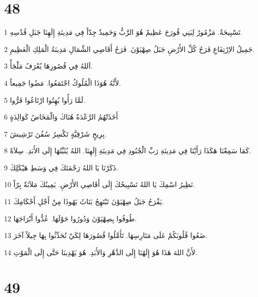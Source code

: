 \chapter{48}

\par 1 تَسْبِيحَةٌ. مَزْمُورٌ لِبَنِي قُورَحَ عَظِيمٌ هُوَ الرَّبُّ وَحَمِيدٌ جِدّاً فِي مَدِينَةِ إِلَهِنَا جَبَلِ قُدْسِهِ.
\par 2 جَمِيلُ الاِرْتِفَاعِ فَرَحُ كُلِّ الأَرْضِ جَبَلُ صِهْيَوْنَ. فَرَحُ أَقَاصِي الشِّمَالِ مَدِينَةُ الْمَلِكِ الْعَظِيمِ.
\par 3 اَللهُ فِي قُصُورِهَا يُعْرَفُ مَلْجَأً.
\par 4 لأَنَّهُ هُوَذَا الْمُلُوكُ اجْتَمَعُوا. مَضُوا جَمِيعاً.
\par 5 لَمَّا رَأُوا بُهِتُوا ارْتَاعُوا فَرُّوا.
\par 6 أَخَذَتْهُمُ الرَّعْدَةُ هُنَاكَ وَالْمَخَاضُ كَوَالِدَةٍ
\par 7 بِرِيحٍ شَرْقِيَّةٍ تَكْسِرُ سُفُنَ تَرْشِيشَ.
\par 8 كَمَا سَمِعْنَا هَكَذَا رَأَيْنَا فِي مَدِينَةِ رَبِّ الْجُنُودِ فِي مَدِينَةِ إِلَهِنَا. اللهُ يُثَبِّتُهَا إِلَى الأَبَدِ. سِلاَهْ.
\par 9 ذَكَرْنَا يَا اللهُ رَحْمَتَكَ فِي وَسَطِ هَيْكَلِكَ.
\par 10 نَظِيرُ اسْمِكَ يَا اللهُ تَسْبِيحُكَ إِلَى أَقَاصِي الأَرْضِ. يَمِينُكَ مَلآنَةٌ بِرّاً.
\par 11 يَفْرَحُ جَبَلُ صِهْيَوْنَ تَبْتَهِجُ بَنَاتُ يَهُوذَا مِنْ أَجْلِ أَحْكَامِكَ.
\par 12 طُوفُوا بِصِهْيَوْنَ وَدُورُوا حَوْلَهَا. عُدُّوا أَبْرَاجَهَا.
\par 13 ضَعُوا قُلُوبَكُمْ عَلَى مَتَارِسِهَا. تَأَمَّلُوا قُصُورَهَا لِكَيْ تُحَدِّثُوا بِهَا جِيلاً آخَرَ.
\par 14 لأَنَّ اللهَ هَذَا هُوَ إِلَهُنَا إِلَى الدَّهْرِ وَالأَبَدِ. هُوَ يَهْدِينَا حَتَّى إِلَى الْمَوْتِ.

\chapter{49}

